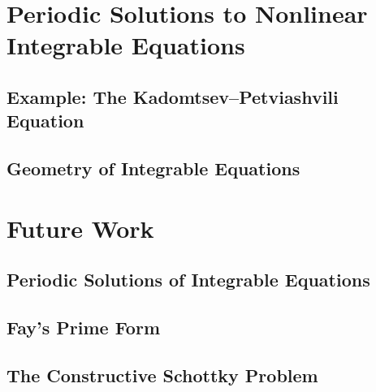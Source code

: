 \documentclass[10pt,twoside]{article}
\theoremstyle{plain}
\theoremstyle{definition}
\numberwithin{equation}{section}
\begin{document}
\section{Periodic Solutions to Nonlinear Integrable Equations}

\subsection{Example: The Kadomtsev--Petviashvili Equation}

\subsection{Geometry of Integrable Equations}


\section{Future Work}

\subsection{Periodic Solutions of Integrable Equations}

\subsection{Fay's Prime Form}

\subsection{The Constructive Schottky Problem}
\end{document}
